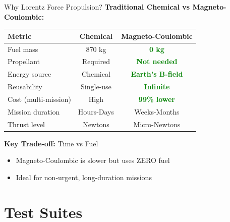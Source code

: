 \documentclass[aspectratio=169]{beamer}
\begin{document}
\begin{frame}{Why Lorentz Force Propulsion?}
\textbf{Traditional Chemical vs Magneto-Coulombic:}

\vspace{0.5em}
\begin{table}
\footnotesize
\begin{tabular}{lcc}
\toprule
\textbf{Metric} & \textbf{Chemical} & \textbf{Magneto-Coulombic} \\
\midrule
Fuel mass & 870 kg & \textcolor{green}{\textbf{0 kg}} \\
Propellant & Required & \textcolor{green}{\textbf{Not needed}} \\
Energy source & Chemical & \textcolor{green}{\textbf{Earth's B-field}} \\
Reusability & Single-use & \textcolor{green}{\textbf{Infinite}} \\
Cost (multi-mission) & High & \textcolor{green}{\textbf{99\% lower}} \\
Mission duration & Hours-Days & Weeks-Months \\
Thrust level & Newtons & Micro-Newtons \\
\bottomrule
\end{tabular}
\end{table}

\vspace{1em}
\textbf{Key Trade-off:} Time vs Fuel
\begin{itemize}
    \item Magneto-Coulombic is slower but uses ZERO fuel
    \item Ideal for non-urgent, long-duration missions
\end{itemize}
\end{frame}

\section{Test Suites}
\end{document}
